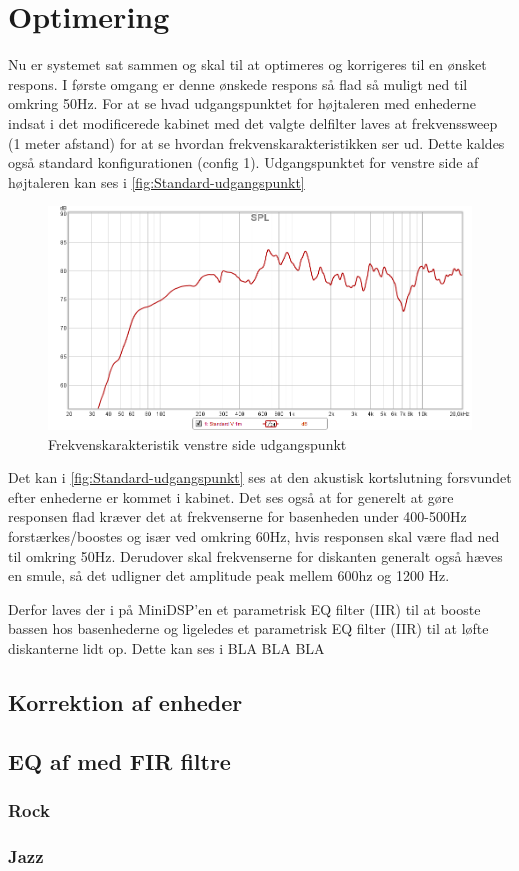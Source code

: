 \section{Optimering}
Nu er systemet sat sammen og skal til at optimeres og korrigeres til en ønsket respons. I første omgang er denne ønskede respons så flad så muligt ned til omkring 50Hz. For at se hvad udgangspunktet for højtaleren med enhederne indsat i det modificerede kabinet med det valgte delfilter laves at frekvenssweep (1 meter afstand) for at se hvordan frekvenskarakteristikken ser ud. Dette kaldes også standard konfigurationen (config 1).  
Udgangspunktet for venstre side af højtaleren kan ses i \autoref*{fig:Standard-udgangspunkt}

\begin{figure}[H] 
	\center
	\includegraphics[width=1\linewidth]{figur/Standard-udgangspunkt}\quad
	\caption{Frekvenskarakteristik venstre side udgangspunkt}
	\label{fig:Standard-udgangspunkt}
\end{figure}

Det kan i \autoref{fig:Standard-udgangspunkt} ses at den akustisk kortslutning forsvundet efter enhederne er kommet i kabinet. Det ses også at for generelt at gøre responsen flad kræver det at frekvenserne for basenheden under 400-500Hz forstærkes/boostes og især ved omkring 60Hz, hvis responsen skal være flad ned til omkring 50Hz. Derudover skal frekvenserne for diskanten generalt også hæves en smule, så det udligner det amplitude peak mellem 600hz og 1200 Hz. 

Derfor laves der i på MiniDSP'en et parametrisk EQ filter (IIR) til at booste bassen hos basenhederne og ligeledes et parametrisk EQ filter (IIR) til at løfte diskanterne lidt op. Dette kan ses i BLA BLA BLA

\subsection{Korrektion af enheder}



\subsection{EQ af med FIR filtre}
\subsubsection{Rock}
\subsubsection{Jazz}
